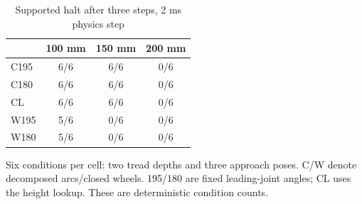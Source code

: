\begin{table}[t]\centering\small
\caption{Supported halt after three steps, 2 ms physics step}
\label{tab:stairs}\begin{tabular}{lccc}\toprule
 & 100 mm & 150 mm & 200 mm\\\midrule
C195 & 6/6 & 6/6 & 0/6\\
C180 & 6/6 & 6/6 & 0/6\\
CL & 6/6 & 6/6 & 0/6\\
W195 & 5/6 & 0/6 & 0/6\\
W180 & 5/6 & 0/6 & 0/6\\
\bottomrule\end{tabular}
\par\vspace{4pt}\noindent\parbox{\columnwidth}{\footnotesize Six conditions per cell: two tread depths and three approach poses. C/W denote decomposed arcs/closed wheels. 195/180 are fixed leading-joint angles; CL uses the height lookup. These are deterministic condition counts.}
\end{table}